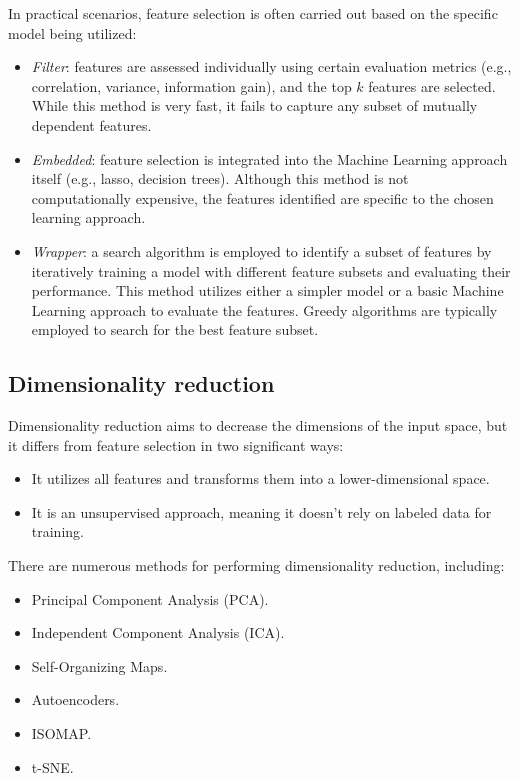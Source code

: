 In practical scenarios, feature selection is often carried out based on the specific model being utilized:
\begin{itemize}
    \item \textit{Filter}: features are assessed individually using certain evaluation metrics (e.g., correlation, variance, information gain), and the top $k$ features are selected. 
        While this method is very fast, it fails to capture any subset of mutually dependent features.
    \item \textit{Embedded}: feature selection is integrated into the Machine Learning approach itself (e.g., lasso, decision trees).
        Although this method is not computationally expensive, the features identified are specific to the chosen learning approach.
    \item \textit{Wrapper}: a search algorithm is employed to identify a subset of features by iteratively training a model with different feature subsets and evaluating their performance. 
        This method utilizes either a simpler model or a basic Machine Learning approach to evaluate the features. 
        Greedy algorithms are typically employed to search for the best feature subset.
\end{itemize}

\subsection{Dimensionality reduction}
Dimensionality reduction aims to decrease the dimensions of the input space, but it differs from feature selection in two significant ways:
\begin{itemize}
    \item It utilizes all features and transforms them into a lower-dimensional space.
    \item It is an unsupervised approach, meaning it doesn't rely on labeled data for training.
\end{itemize}
There are numerous methods for performing dimensionality reduction, including:
\begin{itemize}
    \item Principal Component Analysis (PCA).
    \item Independent Component Analysis (ICA).
    \item Self-Organizing Maps.
    \item Autoencoders.
    \item ISOMAP.\@
    \item t-SNE.\@
\end{itemize}